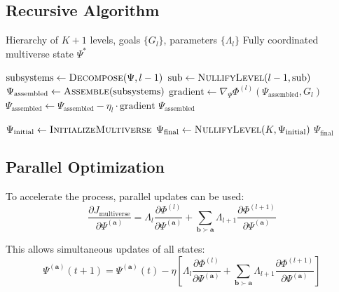 \documentclass[12pt,a4paper]{article}
\newcommand{\bfa}{\mathbf{a}}
\newcommand{\bfb}{\mathbf{b}}
\newcommand{\PhiFunc}{\Phi}
\begin{document}
\subsection{Recursive Algorithm}

\begin{algorithm}[H]
\caption{GRA\_Multiverse\_Nullification}
\begin{algorithmic}[1]
\Require Hierarchy of $K+1$ levels, goals $\{G_l\}$, parameters $\{\Lambda_l\}$
\Ensure Fully coordinated multiverse state $\Psi^*$

        \State \Return {}
    \Else
        \State $\text{subsystems} \gets \Call{Decompose}{\Psi, l-1}$
            \State $\text{sub} \gets \Call{NullifyLevel}{l-1, \text{sub}}$
        \EndFor
        \State $\Psi_\text{assembled} \gets \Call{Assemble}{\text{subsystems}}$
        \While{$\PhiFunc^{(l)}(\Psi_\text{assembled}, G_l) > \varepsilon_l$}
            \State $\text{gradient} \gets \nabla_\Psi \PhiFunc^{(l)}(\Psi_\text{assembled}, G_l)$
            \State $\Psi_\text{assembled} \gets \Psi_\text{assembled} - \eta_l \cdot \text{gradient}$
        \EndWhile
        \State \Return $\Psi_\text{assembled}$
    \EndIf
\EndFunction

\State $\Psi_\text{initial} \gets \Call{InitializeMultiverse}{}$
\State $\Psi_\text{final} \gets \Call{NullifyLevel}{K, \Psi_\text{initial}}$
\State \Return $\Psi_\text{final}$
\end{algorithmic}
\end{algorithm}

\subsection{Parallel Optimization}

To accelerate the process, parallel updates can be used:
\begin{equation}
\frac{\partial J_{\text{multiverse}}}{\partial \Psi^{(\bfa)}} = 
\Lambda_l \frac{\partial \PhiFunc^{(l)}}{\partial \Psi^{(\bfa)}} + 
\sum_{\bfb \succ \bfa} \Lambda_{l+1} \frac{\partial \PhiFunc^{(l+1)}}{\partial \Psi^{(\bfa)}}
\end{equation}

This allows simultaneous updates of all states:
\begin{equation}
\Psi^{(\bfa)}(t+1) = \Psi^{(\bfa)}(t) - \eta \left[
\Lambda_l \frac{\partial \PhiFunc^{(l)}}{\partial \Psi^{(\bfa)}} + 
\sum_{\bfb \succ \bfa} \Lambda_{l+1} \frac{\partial \PhiFunc^{(l+1)}}{\partial \Psi^{(\bfa)}}
\right]
\end{equation}
\end{document}
